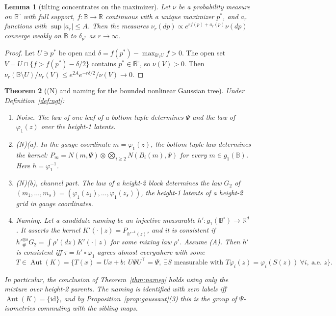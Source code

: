 \documentclass[11pt]{article}
\newtheorem{theorem}{Theorem}
\newtheorem{lemma}[theorem]{Lemma}
\theoremstyle{definition}
\newcommand{\R}{\mathbb R}
\begin{document}
\begin{lemma}[tilting concentrates on the maximizer]\label{lem:laplace}
Let $\nu$ be a probability measure on $\mathbb B^\circ$ with full support, $f:\mathbb B\to\R$ continuous
with a unique maximizer $p^*$, and $a_r$ functions with $\sup|a_r|\le A$. Then the measures
$\nu_r(dp)\propto e^{rf(p)+a_r(p)}\nu(dp)$ converge weakly on $\mathbb B$ to $\delta_{p^*}$ as $r\to\infty$.
\end{lemma}
\begin{proof}
Let $U\ni p^*$ be open and $\delta=f(p^*)-\max_{\mathbb B\setminus U}f>0$. The open set
$V=U\cap\{f>f(p^*)-\delta/2\}$ contains $p^*\in\overline{\mathbb B^\circ}$, so $\nu(V)>0$. Then
$\nu_r(\mathbb B\setminus U)/\nu_r(V)\le e^{2A}e^{-r\delta/2}/\nu(V)\to0$.
\end{proof}

\begin{theorem}[(N) and naming for the bounded nonlinear Gaussian tree]\label{thm:ngt}
Under Definition~\ref{def:ngt}:
\begin{enumerate}
\item \emph{Noise.} The law of one leaf of a bottom tuple determines $\Psi$ and the law of
$\varphi_1(z)$ over the height-1 latents.
\item \emph{(N)(a).} In the gauge coordinate $m=\varphi_1(z)$, the bottom tuple law determines the
kernel: $P_m=N(m,\Psi)\otimes\bigotimes_{i\ge2}N(B_i(m),\Psi)$ for every $m\in g_1(\mathbb B)$. Here
$h=\varphi_1^{-1}$.
\item \emph{(N)(b), channel part.} The law of a height-2 block determines the law $G_2$ of
$(m_1,\dots,m_s)=(\varphi_1(z_1),\dots,\varphi_1(z_s))$, the height-1 latents of a height-2 grid in gauge
coordinates.
\item \emph{Naming.} Let a candidate naming be an injective measurable $h':g_1(\mathbb B^\circ)\to\R^d$.
It asserts the kernel $K'(\cdot\mid z)=P_{h'^{-1}(z)}$, and it is \emph{consistent} if
$h'^{\otimes s}_{\#}G_2=\int\rho'(dz)K'(\cdot\mid z)$ for some mixing law $\rho'$. Assume (A). Then $h'$
is consistent iff $\tau=h'\circ\varphi_1$ agrees almost everywhere with some
\[
T\in\operatorname{Aut}(K)=\big\{T(x)=Ux+b:\ U\Psi U^{\!\top}=\Psi,\ \exists S\text{ measurable with }
T\varphi_i(z)=\varphi_i(S(z))\ \forall i,\ \text{a.e. }z\big\}.
\]
\end{enumerate}
In particular, the conclusion of Theorem~\ref{thm:nameg} holds using only the \emph{mixture} over
height-2 parents. The naming is identified with zero labels iff $\operatorname{Aut}(K)=\{\mathrm{id}\}$,
and by Proposition~\ref{prop:gaussaut}(3) this is the group of $\Psi$-isometries commuting with the
sibling maps.
\end{theorem}
\end{document}
